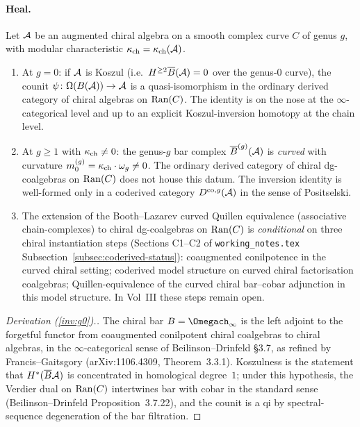 \paragraph{Heal.}

\begin{theorem}
\label{thm:gelfand-inversion-genus}
\ClaimStatusDerivation{}
Let $\mathcal{A}$ be an augmented chiral algebra on a smooth complex curve
$C$ of genus $g$, with modular characteristic $\kappa_{\mathrm{ch}} = \kappa_{\mathrm{ch}}(\mathcal{A})$.
\begin{enumerate}[label=\textup{(\roman*)}]
\item\label{inv:g0} At $g = 0$: if $\mathcal{A}$ is Koszul
(i.e.\ $H^{\geq 2} \overline{B}(\mathcal{A}) = 0$ over the genus-$0$ curve), the
counit
$\psi \colon \Omega(B(\mathcal{A})) \to \mathcal{A}$
is a quasi-isomorphism in the ordinary derived category of chiral
algebras on $\mathrm{Ran}(C)$. The identity is on the nose at the
$\infty$-categorical level and up to an explicit Koszul-inversion
homotopy at the chain level.

\item\label{inv:ghigher} At $g \geq 1$ with $\kappa_{\mathrm{ch}} \neq 0$: the
genus-$g$ bar complex $\overline{B}^{(g)}(\mathcal{A})$ is \emph{curved} with
curvature $m_0^{(g)} = \kappa_{\mathrm{ch}} \cdot \omega_g \neq 0$. The
ordinary derived category of chiral dg-coalgebras on $\mathrm{Ran}(C)$
does not house this datum. The inversion identity is
well-formed only in a coderived category $D^{\mathrm{co},g}(\mathcal{A})$
in the sense of Positselski.

\item\label{inv:chiral-bl} The extension of the Booth--Lazarev
curved Quillen equivalence (associative chain-complexes) to
chiral dg-coalgebras on $\mathrm{Ran}(C)$ is \emph{conditional} on
three chiral instantiation steps (Sections C1--C2 of
\texttt{working\_notes.tex} Subsection~\ref{subsec:coderived-status}):
coaugmented conilpotence in the curved chiral setting; coderived
model structure on curved chiral factorisation coalgebras;
Quillen-equivalence of the curved chiral bar--cobar adjunction in
this model structure. In Vol~III these steps remain open.
\end{enumerate}
\end{theorem}

\begin{proof}[Derivation (\ref{inv:g0}).]
The chiral bar $B = \Omegach_\infty$ is the left adjoint to the
forgetful functor from coaugmented conilpotent chiral coalgebras to
chiral algebras, in the $\infty$-categorical sense of Beilinson--Drinfeld
\S 3.7, as refined by Francis--Gaitsgory (arXiv:1106.4309,
Theorem~3.3.1). Koszulness is the statement that $H^*(\overline{B}\mathcal{A})$ is
concentrated in homological degree~$1$; under this hypothesis, the
Verdier dual on $\mathrm{Ran}(C)$ intertwines bar with cobar in the
standard sense (Beilinson--Drinfeld Proposition~3.7.22), and the
counit is a qi by spectral-sequence degeneration of the bar
filtration.
\end{proof}

